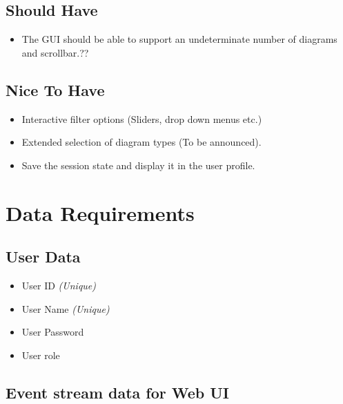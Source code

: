 \documentclass[twoside, english, draft]{Pflichtenheft}
\begin{document}
\subsection{Should Have}
\begin{itemize}
\item{The GUI should be able to support an undeterminate number of diagrams and scrollbar.??}
\end{itemize}
\subsection{Nice To Have}
\begin{itemize}
\item{Interactive filter options (Sliders, drop down menus etc.)}
\item{Extended selection of diagram types (To be announced).}
\item{Save the session state and display it in the user profile.}

\end{itemize}

\section{Data Requirements}
\subsection{User Data}

	\begin{itemize}
		\item User ID \textit{(Unique)}
		\item User Name \textit{(Unique)}
		\item User Password
		\item User \gls{role}
	\end{itemize}


\subsection{Event stream data for Web UI}
\end{document}
